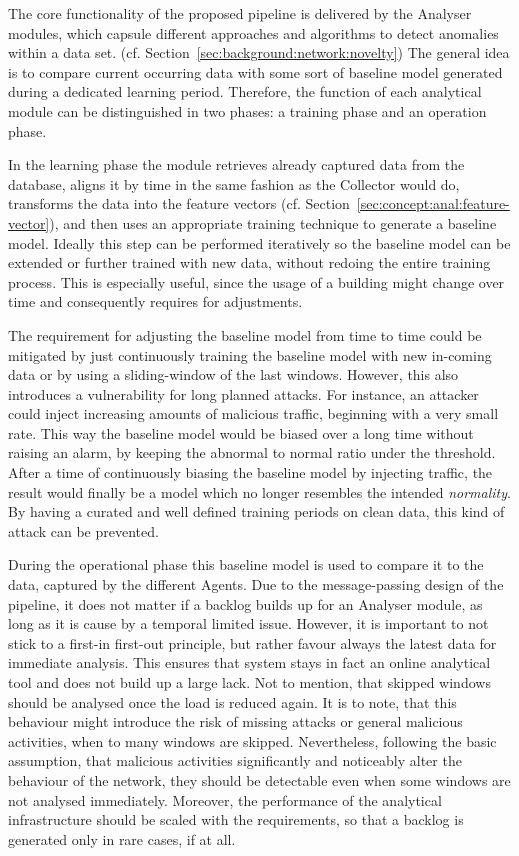 The core functionality of the proposed pipeline is delivered by the Analyser modules, which capsule different approaches and algorithms to detect anomalies within a data set. (cf. Section~\ref{sec:background:network:novelty})
The general idea is to compare current occurring data with some sort of baseline model generated during a dedicated learning period.
Therefore, the function of each analytical module can be distinguished in two phases: a training phase and an operation phase.

In the learning phase the module retrieves already captured data from the database, aligns it by time in the same fashion as the Collector would do, transforms the data into the feature vectors (cf. Section~\ref{sec:concept:anal:feature-vector}), and then uses an appropriate training technique to generate a baseline model.
Ideally this step can be performed iteratively so the baseline model can be extended or further trained with new data, without redoing the entire training process. This is especially useful, since the usage of a building might change over time and consequently requires for adjustments.

The requirement for adjusting the baseline model from time to time could be mitigated by just continuously training the baseline model with new in-coming data or by using a sliding-window of the last windows. 
However, this also introduces a vulnerability for long planned attacks. For instance, an attacker could inject increasing amounts of malicious traffic, beginning with a very small rate. This way the baseline model would be biased over a long time without raising an alarm, by keeping the abnormal to normal ratio under the threshold. After a time of continuously biasing the baseline model by injecting traffic, the result would finally be a model which no longer resembles the intended \emph{normality}.
By having a curated and well defined training periods on clean data, this kind of attack can be prevented.

During the operational phase this baseline model is used to compare it to the data, captured by the different Agents.
Due to the message-passing design of the pipeline, it does not matter if a backlog builds up for an Analyser module, as long as it is cause by a temporal limited issue.
However, it is important to not stick to a first-in first-out principle, but rather favour always the latest data for immediate analysis. This ensures that system stays in fact an online analytical tool and does not build up a large lack. Not to mention, that skipped windows should be analysed once the load is reduced again.
It is to note, that this behaviour might introduce the risk of missing attacks or general malicious activities, when to many windows are skipped.
Nevertheless, following the basic assumption, that malicious activities significantly and noticeably alter the behaviour of the network, they should be detectable even when some windows are not analysed immediately. Moreover, the performance of the analytical infrastructure should be scaled with the requirements, so that a backlog is generated only in rare cases, if at all.

